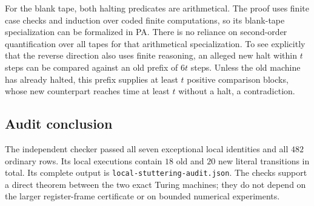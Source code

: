 For the blank tape, both halting predicates are arithmetical.  The
proof uses finite case checks and induction over coded finite
computations, so its blank-tape specialization can be formalized in PA.
There is no reliance on second-order quantification over all tapes for
that arithmetical specialization.  To see explicitly that the reverse
direction also uses finite reasoning, an alleged new halt within $t$
steps can be compared against an old prefix of $6t$ steps.  Unless the
old machine has already halted, this prefix supplies at least $t$
positive comparison blocks, whose new counterpart reaches time at least
$t$ without a halt, a contradiction.

\subsection{Audit conclusion}

The independent checker passed all seven exceptional local identities
and all $482$ ordinary rows.  Its local executions contain $18$ old and
$20$ new literal transitions in total.  Its complete output is
\texttt{local-stuttering-audit.json}.  The checks support a direct theorem
between the two exact Turing machines; they do not depend on the larger
register-frame certificate or on bounded numerical experiments.
